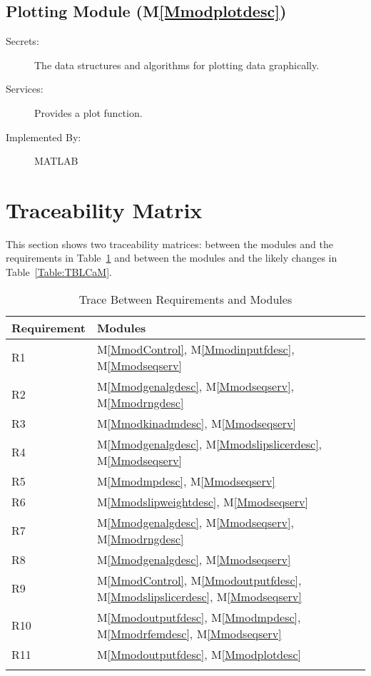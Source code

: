 \documentclass[12pt]{article}
\begin{document}
\subsection{Plotting Module (M\ref{Mmodplotdesc})}
\label{Sec:PM()}
\begin{description}
\item[Secrets:]The data structures and algorithms for plotting data graphically.
\item[Services:]Provides a plot function.
\item[Implemented By:]MATLAB
\end{description}
\section{Traceability Matrix}
\label{Sec:TM}
This section shows two traceability matrices: between the modules and the requirements in Table~\ref{Table:TBRaM} and between the modules and the likely changes in Table~\ref{Table:TBLCaM}.
\begin{longtable}{l l}
\toprule
Requirement & Modules
\\
\midrule
R1 & M\ref{MmodControl}, M\ref{Mmodinputfdesc}, M\ref{Mmodseqserv}
\\
R2 & M\ref{Mmodgenalgdesc}, M\ref{Mmodseqserv}, M\ref{Mmodrngdesc}
\\
R3 & M\ref{Mmodkinadmdesc}, M\ref{Mmodseqserv}
\\
R4 & M\ref{Mmodgenalgdesc}, M\ref{Mmodslipslicerdesc}, M\ref{Mmodseqserv}
\\
R5 & M\ref{Mmodmpdesc}, M\ref{Mmodseqserv}
\\
R6 & M\ref{Mmodslipweightdesc}, M\ref{Mmodseqserv}
\\
R7 & M\ref{Mmodgenalgdesc}, M\ref{Mmodseqserv}, M\ref{Mmodrngdesc}
\\
R8 & M\ref{Mmodgenalgdesc}, M\ref{Mmodseqserv}
\\
R9 & M\ref{MmodControl}, M\ref{Mmodoutputfdesc}, M\ref{Mmodslipslicerdesc}, M\ref{Mmodseqserv}
\\
R10 & M\ref{Mmodoutputfdesc}, M\ref{Mmodmpdesc}, M\ref{Mmodrfemdesc}, M\ref{Mmodseqserv}
\\
R11 & M\ref{Mmodoutputfdesc}, M\ref{Mmodplotdesc}
\\
\bottomrule
\caption{Trace Between Requirements and Modules}
\label{Table:TBRaM}
\end{longtable}
\end{document}

